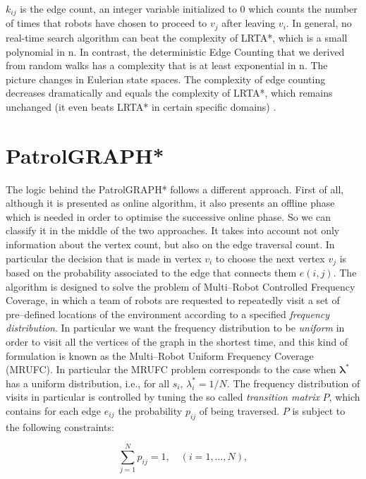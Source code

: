 $k_{ij}$ is the edge count, an integer variable initialized to $0$ which counts the number of times that robots have chosen to proceed to $v_j$ after leaving $v_i$. In general, no real-time search algorithm can beat the complexity of LRTA*, which is a small polynomial in n. In contrast, the deterministic Edge Counting that we derived from random walks has a complexity that is at least exponential in n. The picture changes in Eulerian state spaces. The complexity of edge counting decreases dramatically and equals the complexity of LRTA*, which remains unchanged (it even beats LRTA* in certain specific domains) \cite{Koenig96easyand}. 


\section{PatrolGRAPH*}

The logic behind the PatrolGRAPH* follows a different approach. First of all, although it is presented as online algorithm, it also presents an offline phase which is needed in order to optimise the successive online phase. So we can classify it in the middle of the two approaches. It takes into account not only information about the vertex count, but also on the edge traversal count. In particular the decision that is made in vertex $v_i$ to choose the next vertex $v_j$ is based on the probability associated to the edge that connects them $e(i,j)$.
The algorithm is designed to solve the problem of Multi--Robot Controlled Frequency Coverage, in which a team of robots are requested to repeatedly visit a set of pre--defined locations of the environment according to a specified \emph{frequency distribution}. In particular we want the frequency distribution to be \emph{uniform} in order to visit all the vertices of the graph in the shortest time, and this kind of formulation is known as the Multi--Robot Uniform Frequency Coverage (MRUFC). In particular the MRUFC problem corresponds to the case when ${\bm{\lambda}}^*$ has a uniform distribution, i.e., for all $s_i$, $\lambda_i^* = 1/N$.  The frequency distribution of visits in particular is controlled by tuning the so called \emph{transition matrix} $P$, which contains for each edge $e_{ij}$ the probability $p_{ij}$ of being traversed. $P$ is subject to the following constraints:

\begin{equation}
\sum\limits_{j=1}^{N} {p_{ij} } = 1, \quad (i=1,\ldots,N),
\label{Pmatrix3b}
\end{equation}

